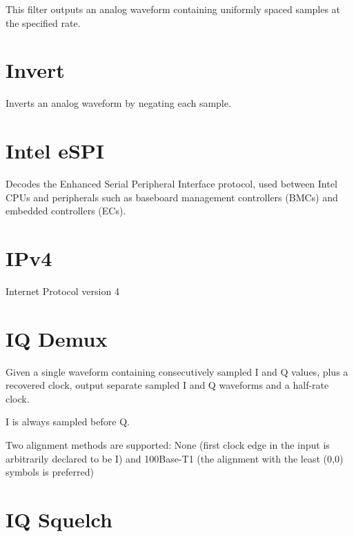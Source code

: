 This filter outputs an analog waveform containing uniformly spaced samples at the specified rate.

\pagebreak
\section{Invert}
\label{filter:invert}

Inverts an analog waveform by negating each sample.

\pagebreak
\section{Intel eSPI}

Decodes the Enhanced Serial Peripheral Interface protocol, used between Intel CPUs and peripherals such as baseboard
management controllers (BMCs) and embedded controllers (ECs).

\pagebreak
\section{IPv4}

Internet Protocol version 4

\pagebreak
\section{IQ Demux}

Given a single waveform containing consecutively sampled I and Q values, plus a recovered clock, output separate
sampled I and Q waveforms and a half-rate clock.

I is always sampled before Q.

Two alignment methods are supported: None (first clock edge in the input is arbitrarily declared to be I)
and 100Base-T1 (the alignment with the least (0,0) symbols is preferred)

\pagebreak
\section{IQ Squelch}

